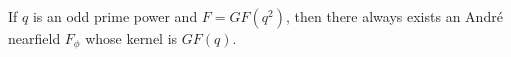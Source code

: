 If $q$ is an odd prime power and $F = GF(q^2)$, then there always exists an André nearfield $F_{\phi}$ whose kernel is $GF(q)$.
